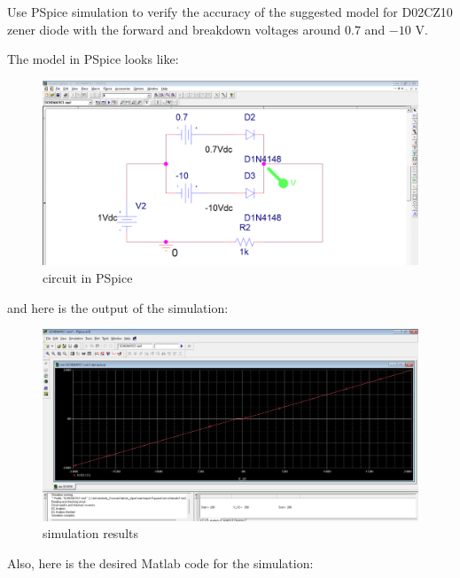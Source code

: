 \documentclass[11pt]{article}
\begin{document}
\begin{question}
\begin{subquestion}{Use PSpice simulation to verify the accuracy of the suggested model for D02CZ10 zener diode with the forward and breakdown voltages around $0.7$ and $-10$ V. }
{            The model in PSpice looks like:
            \begin{figure}[H]
                \centering
                \includegraphics[scale=0.35,angle=0]{Fig/Q5_1.png}
                \caption{circuit in PSpice}
            \end{figure}

            and here is the output of the simulation:
            \begin{figure}[H]
                \centering
                \includegraphics[scale=0.35,angle=0]{Fig/Q5_2.png}
                \caption{simulation results}
            \end{figure}

            Also, here is the desired Matlab code for the simulation:
            
            

        }

    \end{subquestion}

\end{question}



\end{document}
